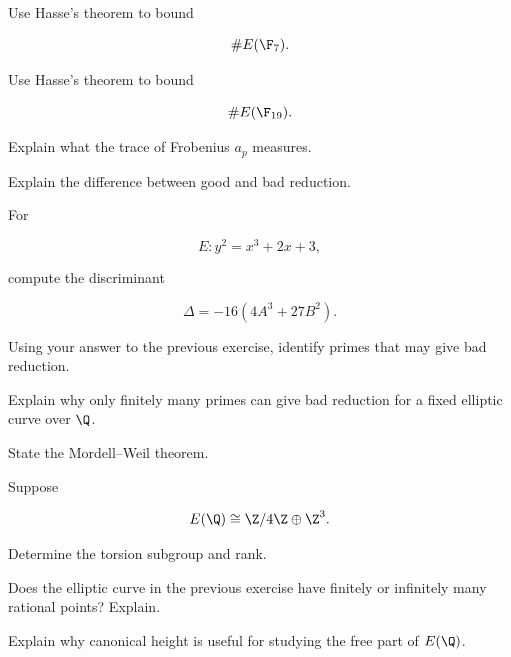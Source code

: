 \begin{exercise}[2]
Use Hasse's theorem to bound

\[ \#E(\F_7). \]
\end{exercise}

\begin{exercise}[2]
Use Hasse's theorem to bound

\[ \#E(\F_{19}). \]
\end{exercise}

\begin{exercise}[2]
Explain what the trace of Frobenius \(a_p\) measures.
\end{exercise}

\begin{exercise}[2]
Explain the difference between good and bad reduction.
\end{exercise}

\begin{exercise}[2]
For

\[ E:y^2=x^3+2x+3, \]

compute the discriminant

\[ \Delta=-16(4A^3+27B^2). \]
\end{exercise}

\begin{exercise}[2]
Using your answer to the previous exercise, identify primes that may give bad
reduction.
\end{exercise}

\begin{exercise}[2]
Explain why only finitely many primes can give bad reduction for a fixed
elliptic curve over \(\Q\).
\end{exercise}

\begin{exercise}[2]
State the Mordell--Weil theorem.
\end{exercise}

\begin{exercise}[1]
Suppose

\[ E(\Q)\cong\Z/4\Z\oplus\Z^3. \]

Determine the torsion subgroup and rank.
\end{exercise}

\begin{exercise}[2]
Does the elliptic curve in the previous exercise have finitely or infinitely
many rational points? Explain.
\end{exercise}

\begin{exercise}[2]
Explain why canonical height is useful for studying the free part of
\(E(\Q)\).
\end{exercise}

